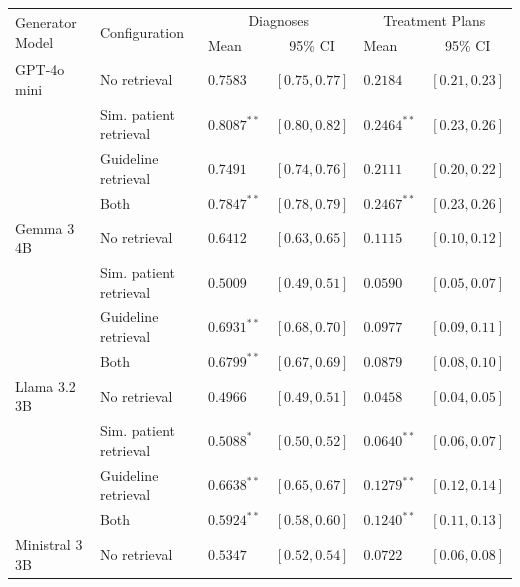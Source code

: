 \begin{table}[!b]
\centering
\small
\setlength{\tabcolsep}{2pt}
\begin{tabular*}{\textwidth}{@{\extracolsep{\fill}}lllclc@{}}
\toprule
\multirow{2}{*}{Generator Model} & \multirow{2}{*}{Configuration} & \multicolumn{2}{c}{Diagnoses} & \multicolumn{2}{c}{Treatment Plans} \\
\cmidrule(lr){3-4}\cmidrule(lr){5-6}
 & & Mean & 95\% CI & Mean & 95\% CI \\
\midrule
GPT-4o mini & No retrieval & $0.7583$ & {\scriptsize $[0.75, 0.77]$} & $0.2184$ & {\scriptsize $[0.21, 0.23]$} \\[2pt]
 & Sim. patient retrieval & $\mathbf{0.8087}^{**}$ & {\scriptsize $[0.80, 0.82]$} & $0.2464^{**}$ & {\scriptsize $[0.23, 0.26]$} \\
 & Guideline retrieval & $0.7491$ & {\scriptsize $[0.74, 0.76]$} & $0.2111$ & {\scriptsize $[0.20, 0.22]$} \\
 & Both & $0.7847^{**}$ & {\scriptsize $[0.78, 0.79]$} & $\mathbf{0.2467}^{**}$ & {\scriptsize $[0.23, 0.26]$} \\
\midrule
Gemma 3 4B & No retrieval & $0.6412$ & {\scriptsize $[0.63, 0.65]$} & $\mathbf{0.1115}$ & {\scriptsize $[0.10, 0.12]$} \\[2pt]
 & Sim. patient retrieval & $0.5009$ & {\scriptsize $[0.49, 0.51]$} & $0.0590$ & {\scriptsize $[0.05, 0.07]$} \\
 & Guideline retrieval & $\mathbf{0.6931}^{**}$ & {\scriptsize $[0.68, 0.70]$} & $0.0977$ & {\scriptsize $[0.09, 0.11]$} \\
 & Both & $0.6799^{**}$ & {\scriptsize $[0.67, 0.69]$} & $0.0879$ & {\scriptsize $[0.08, 0.10]$} \\
\midrule
Llama 3.2 3B & No retrieval & $0.4966$ & {\scriptsize $[0.49, 0.51]$} & $0.0458$ & {\scriptsize $[0.04, 0.05]$} \\[2pt]
 & Sim. patient retrieval & $0.5088^{*}$ & {\scriptsize $[0.50, 0.52]$} & $0.0640^{**}$ & {\scriptsize $[0.06, 0.07]$} \\
 & Guideline retrieval & $\mathbf{0.6638}^{**}$ & {\scriptsize $[0.65, 0.67]$} & $\mathbf{0.1279}^{**}$ & {\scriptsize $[0.12, 0.14]$} \\
 & Both & $0.5924^{**}$ & {\scriptsize $[0.58, 0.60]$} & $0.1240^{**}$ & {\scriptsize $[0.11, 0.13]$} \\
\midrule
Ministral 3 3B & No retrieval & $0.5347$ & {\scriptsize $[0.52, 0.54]$} & $0.0722$ & {\scriptsize $[0.06, 0.08]$} \\[2pt]

\end{tabular*}
\end{table}
